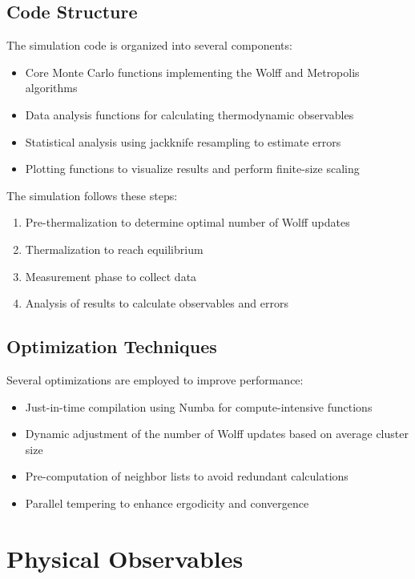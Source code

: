 \documentclass[12pt,a4paper]{article}
\begin{document}
\subsection{Code Structure}

The simulation code is organized into several components:
\begin{itemize}
    \item Core Monte Carlo functions implementing the Wolff and Metropolis algorithms
    \item Data analysis functions for calculating thermodynamic observables
    \item Statistical analysis using jackknife resampling to estimate errors
    \item Plotting functions to visualize results and perform finite-size scaling
\end{itemize}

The simulation follows these steps:
\begin{enumerate}
    \item Pre-thermalization to determine optimal number of Wolff updates
    \item Thermalization to reach equilibrium
    \item Measurement phase to collect data
    \item Analysis of results to calculate observables and errors
\end{enumerate}

\subsection{Optimization Techniques}

Several optimizations are employed to improve performance:
\begin{itemize}
    \item Just-in-time compilation using Numba for compute-intensive functions
    \item Dynamic adjustment of the number of Wolff updates based on average cluster size
    \item Pre-computation of neighbor lists to avoid redundant calculations
    \item Parallel tempering to enhance ergodicity and convergence
\end{itemize}

\section{Physical Observables}
\end{document}
